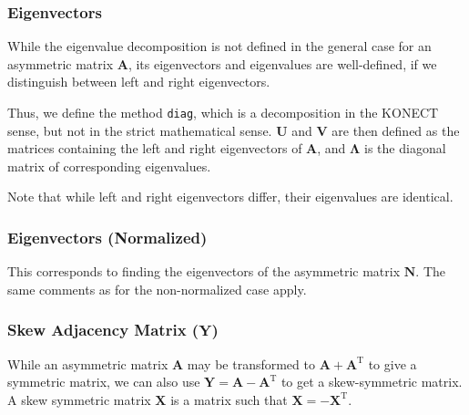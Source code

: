 \documentclass{article}
\begin{document}
\subsubsection{Eigenvectors}
While the eigenvalue decomposition is not defined in the general case
for an asymmetric matrix $\mathbf A$, its eigenvectors and eigenvalues
are well-defined, if we distinguish between left and right
eigenvectors.

Thus, we define the method \texttt{diag}, which is a decomposition in
the KONECT sense, but not in the strict mathematical sense. 
$\mathbf U$ and $\mathbf V$ are then defined as the matrices containing
the left and right eigenvectors of $\mathbf A$, and $\mathbf \Lambda$ is
the diagonal matrix of corresponding eigenvalues. 

Note that while left and right eigenvectors differ, their eigenvalues
are identical. 

\subsubsection{Eigenvectors (Normalized)}
This corresponds to finding the eigenvectors of the asymmetric matrix
$\mathbf N$. 
The same comments as for the non-normalized case apply. 

\subsubsection{Skew Adjacency Matrix ($\mathbf Y$)}
While an asymmetric matrix $\mathbf A$ may be transformed to $\mathbf A
+ \mathbf A^{\mathrm T}$ to give a symmetric matrix, we can also use
$\mathbf Y = \mathbf A - \mathbf A^{\mathrm T}$ to get a skew-symmetric matrix.  A
skew symmetric matrix $\mathbf X$ is a matrix such that $\mathbf X =
-\mathbf X^{\mathrm T}$.
\end{document}
